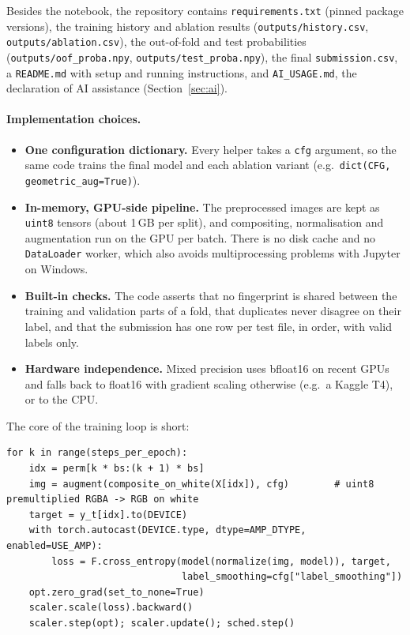 \documentclass[11pt,a4paper]{article}
\newcommand{\code}[1]{\texttt{\small #1}}
\begin{document}
\noindent Besides the notebook, the repository contains \code{requirements.txt} (pinned package versions),
the training history and ablation results (\code{outputs/history.csv}, \code{outputs/ablation.csv}), the
out-of-fold and test probabilities (\code{outputs/oof\_proba.npy}, \code{outputs/test\_proba.npy}), the
final \code{submission.csv}, a \code{README.md} with setup and running instructions, and
\code{AI\_USAGE.md}, the declaration of AI assistance (Section~\ref{sec:ai}).

\paragraph{Implementation choices.}
\begin{itemize}
  \item \textbf{One configuration dictionary.} Every helper takes a \code{cfg} argument, so the same code
  trains the final model and each ablation variant (e.g.\ \code{dict(CFG, geometric\_aug=True)}).
  \item \textbf{In-memory, GPU-side pipeline.} The preprocessed images are kept as \code{uint8} tensors
  (about 1\,GB per split), and compositing, normalisation and augmentation run on the GPU per batch.
  There is no disk cache and no \code{DataLoader} worker, which also avoids multiprocessing problems with
  Jupyter on Windows.
  \item \textbf{Built-in checks.} The code asserts that no fingerprint is shared between the training and
  validation parts of a fold, that duplicates never disagree on their label, and that the submission has
  one row per test file, in order, with valid labels only.
  \item \textbf{Hardware independence.} Mixed precision uses bfloat16 on recent GPUs and falls back to
  float16 with gradient scaling otherwise (e.g.\ a Kaggle T4), or to the CPU.
\end{itemize}

The core of the training loop is short:
\begin{lstlisting}
for k in range(steps_per_epoch):
    idx = perm[k * bs:(k + 1) * bs]
    img = augment(composite_on_white(X[idx]), cfg)        # uint8 premultiplied RGBA -> RGB on white
    target = y_t[idx].to(DEVICE)
    with torch.autocast(DEVICE.type, dtype=AMP_DTYPE, enabled=USE_AMP):
        loss = F.cross_entropy(model(normalize(img, model)), target,
                               label_smoothing=cfg["label_smoothing"])
    opt.zero_grad(set_to_none=True)
    scaler.scale(loss).backward()
    scaler.step(opt); scaler.update(); sched.step()
\end{lstlisting}
\end{document}
